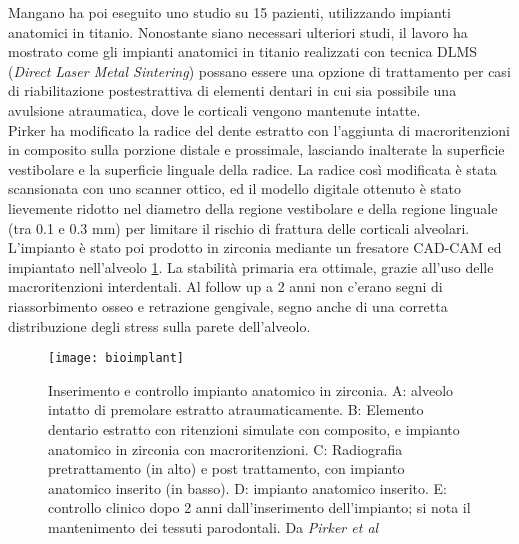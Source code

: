 Mangano \parencite{Reference85} ha poi eseguito uno studio su 15 pazienti, utilizzando impianti anatomici in titanio. Nonostante siano necessari ulteriori studi, il lavoro ha mostrato come gli impianti anatomici in titanio realizzati con tecnica DLMS (\emph{Direct Laser Metal Sintering}) possano essere una opzione di trattamento per casi di riabilitazione postestrattiva di elementi dentari in cui sia possibile una avulsione atraumatica, dove le corticali vengono mantenute intatte. \\
Pirker \parencite{Reference86} ha modificato la radice del dente estratto con l'aggiunta di macroritenzioni in composito sulla porzione distale e prossimale, lasciando inalterate la superficie vestibolare e la superficie linguale della radice. La radice così modificata è stata scansionata con uno scanner ottico, ed il modello digitale ottenuto è stato lievemente ridotto nel diametro della regione vestibolare e della regione linguale (tra 0.1 e 0.3 mm) per limitare il rischio di frattura delle corticali alveolari. L'impianto è stato poi prodotto in zirconia mediante un fresatore CAD-CAM ed impiantato nell'alveolo \ref{fig:bioimplant}. La stabilità primaria era ottimale, grazie all'uso delle macroritenzioni interdentali.  Al follow up a 2 anni non c'erano segni di riassorbimento osseo e retrazione gengivale, segno anche di una corretta distribuzione degli stress sulla parete dell'alveolo.
\begin{figure}[h]
\vspace{-10pt}
	\begin{center}
	\texttt{[image: bioimplant]}
    \caption{Inserimento e controllo impianto anatomico in zirconia. A: alveolo intatto di premolare estratto atraumaticamente. B: Elemento dentario estratto con ritenzioni simulate con composito, e impianto anatomico in zirconia con macroritenzioni. C: Radiografia pretrattamento (in alto) e post trattamento, con impianto anatomico inserito (in basso). D: impianto anatomico inserito. E: controllo clinico dopo 2 anni dall'inserimento dell'impianto; si nota il mantenimento dei tessuti parodontali. Da \emph{Pirker et al} \parencite{Reference86}}
    \label{fig:bioimplant}
    \end{center}
\vspace{-30pt}
\end{figure}
\\

